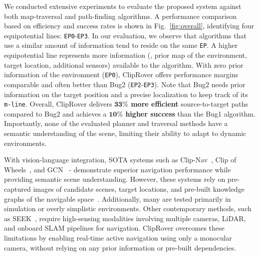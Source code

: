 We conducted extensive experiments to evaluate the proposed system against both map-traversal and path-finding algorithms. A performance comparison based on efficiency and success rates is shown in Fig.~\ref{fig:overall}, identifying four equipotential lines: {\tt EP0}-{\tt EP3}. In our evaluation, we observe that algorithms that use a similar amount of information tend to reside on the same {\tt EP}. A higher equipotential line represents more information (\eg, prior map of the environment, target location, additional sensors) available to the algorithm. With zero prior information of the environment ({\tt EP0}), ClipRover offers performance margins comparable and often better than Bug2 ({\tt EP2}-{\tt EP3}). Note that Bug2 needs prior information on the target position and a precise localization to keep track of its {\tt m-line}. Overall, ClipRover delivers  \textbf{$\mathbf{33\%}$ more efficient} source-to-target paths compared to Bug2 and achieves a \textbf{$\mathbf{10\%}$ higher success} than the Bug1 algorithm. Importantly, none of the evaluated planner and traversal methods have a semantic understanding of the scene, limiting their ability to adapt to dynamic environments. 


With vision-language integration, SOTA systems such as Clip-Nav~\cite{dorbala2022clipnav}, Clip of Wheels~\cite{Gadre2022CoWsOP}, and GCN~\cite{kiran2022spatialrelationgraphgraph} - demonstrate superior navigation performance while providing semantic scene understanding. However, these systems rely on pre-captured images of candidate scenes, target locations, and pre-built knowledge graphs of the navigable space~\cite{Savarese-RSS-19}. Additionally, many are tested primarily in simulation or overly simplistic environments. Other contemporary methods, such as SEEK~\cite{Ginting2024Seek}, require high-sensing modalities involving multiple cameras, LiDAR, and onboard SLAM pipelines for navigation. ClipRover overcomes these limitations by enabling real-time active navigation using only a monocular camera, without relying on any prior information or pre-built dependencies.






